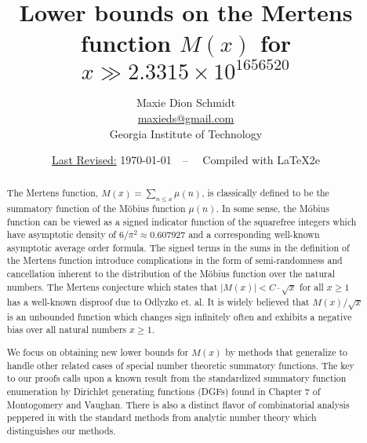 \documentclass[11pt,reqno,a4letter]{article}
\title{
       \LARGE{
       Lower bounds on the Mertens function $M(x)$ for $x \gg 2.3315 \times 10^{1656520}$ 
       } 
}
\author{{\large Maxie Dion Schmidt} \\ 
        {\normalsize \href{mailto:maxieds@gmail.com}{maxieds@gmail.com}} \\[0.1cm] 
        {\small Georgia Institute of Technology} 
}
\date{\small\underline{Last Revised:} \today\ \ -- \ \ Compiled with \LaTeX2e}
\numberwithin{figure}{section}
\numberwithin{table}{section}
\theoremstyle{plain}
\numberwithin{theorem}{section}
\theoremstyle{definition}
\begin{document}
 

\maketitle

\begin{abstract} 
The Mertens function, $M(x) = \sum_{n \leq x} \mu(n)$, is classically 
defined to be the summatory function of the M\"obius function 
$\mu(n)$. In some sense, the M\'obius function can be viewed as a 
signed indicator function of the squarefree integers which have 
asymptotic density of $6 / \pi^2 \approx 0.607927$ and a corresponding 
well-known asymptotic average order formula. The signed terms in the 
sums in the definition of the Mertens function introduce complications 
in the form of semi-randomness and cancellation inherent to the 
distribution of the M\"obius function over the natural numbers. The 
Mertens conjecture which states that $|M(x)| < C \cdot \sqrt{x}$ for all 
$x \geq 1$ has a well-known disproof due to Odlyzko et. al. 
It is widely believed that $M(x) / \sqrt{x}$ is an unbounded function 
which changes sign infinitely often and exhibits a negative bias 
over all natural numbers $x \geq 1$. 

We focus on obtaining new lower bounds 
for $M(x)$ by methods that generalize to handle other related cases of 
special number theoretic summatory functions. 
The key to our proofs calls upon a known result from the standardized 
summatory function enumeration by Dirichlet generating functions (DGFs) 
found in Chapter 7 of Montogomery and Vaughan. There is also a distinct flavor of combinatorial analysis 
peppered in with the standard methods from analytic number theory which distinguishes 
our methods. 


\end{abstract}
\end{document}
